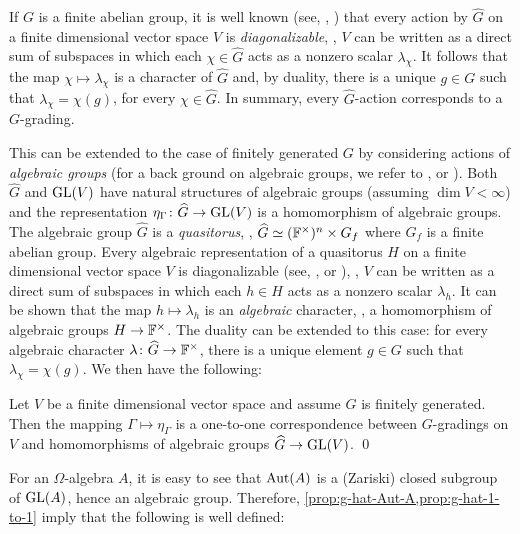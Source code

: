 
% 

If $G$ is a finite abelian group, it is well known (see, \eg, \cite[\S 1.2]{FultonAndHarris}) that every action by $\widehat G$ on a finite dimensional vector space $V$ is \emph{diagonalizable}, \ie, $V$ can be written as a direct sum of subspaces in which each $\chi \in \widehat G$ acts as a nonzero scalar $\lambda_\chi$. 
It follows that the map $\chi \mapsto \lambda_\chi$ is a character of $\widehat G$ and, by duality, there is a unique $g \in G$ such that $\lambda_\chi = \chi(g)$, for every $\chi \in \widehat G$. 
In summary, every $\widehat G$-action corresponds to a $G$-grading.

This can be extended to the case of finitely generated $G$ by considering actions of \emph{algebraic groups} (for a back ground on algebraic groups, we refer to \cite{MR1064110}, \cite{Arzhantsev-notes} or \cite[Appendix A]{livromicha}). 
Both $\widehat G$ and $\operatorname{GL} (V)$ have natural structures of algebraic groups  (assuming $\dim V < \infty$) and the representation $\eta_\Gamma \colon \widehat G \to \operatorname{GL} (V)$ is a homomorphism of algebraic groups. 
The algebraic group $\widehat G$ is a \emph{quasitorus}, \ie, $\widehat G \simeq (\mathbb{F}^\times)^n \times G_f$ where $G_f$ is a finite abelian group. 
Every algebraic representation of a quasitorus $H$ on a finite dimensional vector space $V$ is diagonalizable (see, \eg, \cite[Chapter 3, \S 2, Theorem 3]{MR1064110} or \cite[Theorem 1.6.13]{Arzhantsev-notes}), \ie, $V$ can be written as a direct sum of subspaces in which each $h \in H$ acts as a nonzero scalar $\lambda_h$. 
It can be shown that the map $h \mapsto \lambda_h$ is an \emph{algebraic} character, \ie, a homomorphism of algebraic groups $H \to \mathbb{F}^\times$. 
The duality can be extended to this case: for every algebraic character $\lambda\colon \widehat G \to \mathbb{F}^\times$, there is a unique element $g\in G$ such that $\lambda_\chi = \chi(g)$. 
We then have the following:

\begin{prop}\label{prop:g-hat-1-to-1}
    Let $V$ be a finite dimensional vector space and assume $G$ is finitely generated. 
    Then the mapping $\Gamma \mapsto \eta_\Gamma$ is a one-to-one correspondence between $G$-gradings on $V$ and homomorphisms of algebraic groups $\widehat G \to \operatorname{GL}(V)$. \qed
\end{prop}


For an $\Omega$-algebra $A$, it is easy to see that $\operatorname{Aut} (A)$ is a (Zariski) closed subgroup of $\operatorname{GL} (A)$, hence an algebraic group.
Therefore, \cref{prop:g-hat-Aut-A,prop:g-hat-1-to-1} imply that the following is well defined:

